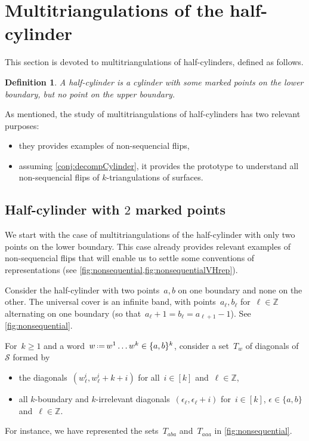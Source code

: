 \documentclass{amsart}
\newtheorem{definition}[theorem]{Definition}
\theoremstyle{remark}
\newcommand{\darkblue}{\color{darkblue}} %
\newcommand{\defn}[1]{\textsl{\darkblue #1}} %
\newcommand{\Z}{\mathbb{Z}} %
\newcommand{\eqdef}{\mbox{\,\raisebox{0.2ex}{\scriptsize\ensuremath{\mathrm:}}\ensuremath{=}\,}} %
\newcommand{\surface}{\mathcal{S}}
\begin{document}

\section{Multitriangulations of the half-cylinder}

This section is devoted to multitriangulations of half-cylinders, defined as follows.

\begin{definition}
A \defn{half-cylinder} is a cylinder with some marked points on the lower boundary, but no point on the upper boundary.
\end{definition}

As mentioned, the study of multitriangulations of half-cylinders has two relevant purposes:
\begin{itemize}
\item they provides examples of non-sequencial flips,
\item assuming \cref{conj:decompCylinder}, it provides the prototype to understand all non-sequencial flips of $k$-triangulations of surfaces.
\end{itemize}



\subsection{Half-cylinder with $2$ marked points}

We start with the case of multitriangulations of the half-cylinder with only two points on the lower boundary.
This case already provides relevant examples of non-sequencial flips that will enable us to settle some conventions of representations (see \cref{fig:nonsequential,fig:nonsequentialVHrep}).

Consider the half-cylinder with two points~$a,b$ on one boundary and none on the other.
The universal cover is an infinite band, with points~$a_{\ell}, b_{\ell}$ for~$\ell \in \Z$ alternating on one boundary (so that~$a_\ell+1 = b_\ell = a_{\ell+1}-1$).
See \cref{fig:nonsequential}.

For~$k \ge 1$ and a word~$w \eqdef w^1 \dots w^k  \in \{a,b\}^k$, consider a set~$T_w$ of diagonals of~$\surface$ formed by
\begin{itemize}
\item the diagonals~$(w^i_\ell, w^i_{\ell}+k+i)$ for all~$i \in [k]$ and~$\ell \in \Z$,
\item all $k$-boundary and $k$-irrelevant diagonals~$(\epsilon_{\ell}, \epsilon_{\ell}+i)$ for~$i \in [k]$, $\epsilon \in \{a,b\}$ and~$\ell \in \Z$.
\end{itemize}
For instance, we have represented the sets~$T_{aba}$ and~$T_{aaa}$ in \cref{fig:nonsequential}.
\end{document}
